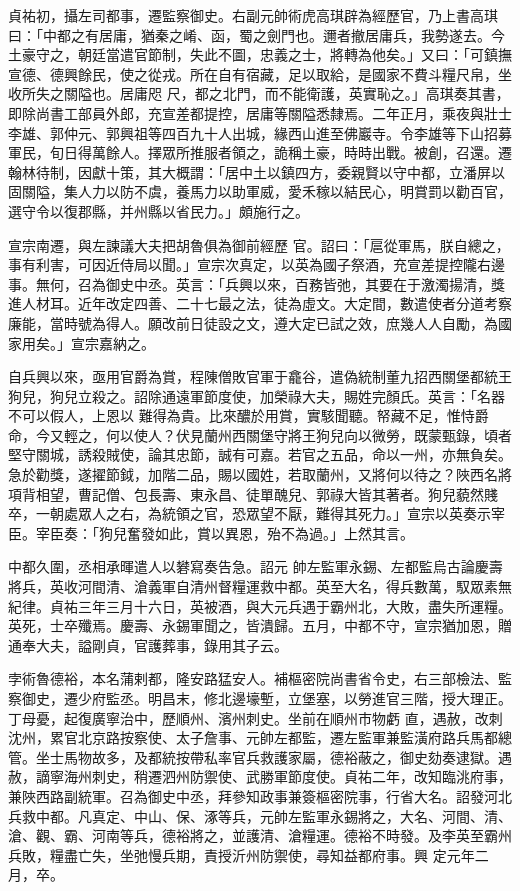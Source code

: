 \begin{pinyinscope}
 貞祐初，攝左司都事，遷監察御史。右副元帥術虎高琪辟為經歷官，乃上書高琪曰：「中都之有居庸，猶秦之崤、函，蜀之劍門也。邇者撤居庸兵，我勢遂去。今土豪守之，朝廷當遣官節制，失此不圖，忠義之士，將轉為他矣。」又曰：「可鎮撫宣德、德興餘民，使之從戎。所在自有宿藏，足以取給，是國家不費斗糧尺帛，坐收所失之關隘也。居庸咫
 尺，都之北門，而不能衛護，英實恥之。」高琪奏其書，即除尚書工部員外郎，充宣差都提控，居庸等關隘悉隸焉。二年正月，乘夜與壯士李雄、郭仲元、郭興祖等四百九十人出城，緣西山進至佛巖寺。令李雄等下山招募軍民，旬日得萬餘人。擇眾所推服者領之，詭稱土豪，時時出戰。被創，召還。遷翰林待制，因獻十策，其大概謂：「居中土以鎮四方，委親賢以守中都，立潘屏以固關隘，集人力以防不虞，養馬力以助軍威，愛禾稼以結民心，明賞罰以勸百官，選守令以復郡縣，并州縣以省民力。」頗施行之。



 宣宗南遷，與左諫議大夫把胡魯俱為御前經歷
 官。詔曰：「扈從軍馬，朕自總之，事有利害，可因近侍局以聞。」宣宗次真定，以英為國子祭酒，充宣差提控隴右邊事。無何，召為御史中丞。英言：「兵興以來，百務皆弛，其要在于激濁揚清，獎進人材耳。近年改定四善、二十七最之法，徒為虛文。大定間，數遣使者分道考察廉能，當時號為得人。願改前日徒設之文，遵大定已試之效，庶幾人人自勵，為國家用矣。」宣宗嘉納之。



 自兵興以來，亟用官爵為賞，程陳僧敗官軍于龕谷，遣偽統制董九招西關堡都統王狗兒，狗兒立殺之。詔除通遠軍節度使，加榮祿大夫，賜姓完顏氏。英言：「名器不可以假人，上恩以
 難得為貴。比來醲於用賞，實駭聞聽。帑藏不足，惟恃爵命，今又輕之，何以使人？伏見蘭州西關堡守將王狗兒向以微勞，既蒙甄錄，頃者堅守關城，誘殺賊使，論其忠節，誠有可嘉。若官之五品，命以一州，亦無負矣。急於勸獎，遂擢節鉞，加階二品，賜以國姓，若取蘭州，又將何以待之？陜西名將項背相望，曹記僧、包長壽、東永昌、徒單醜兒、郭祿大皆其著者。狗兒藐然賤卒，一朝處眾人之右，為統領之官，恐眾望不厭，難得其死力。」宣宗以英奏示宰臣。宰臣奏：「狗兒奮發如此，賞以異恩，殆不為過。」上然其言。



 中都久圍，丞相承暉遣人以礬寫奏告急。詔元
 帥左監軍永錫、左都監烏古論慶壽將兵，英收河間清、滄義軍自清州督糧運救中都。英至大名，得兵數萬，馭眾素無紀律。貞祐三年三月十六日，英被酒，與大元兵遇于霸州北，大敗，盡失所運糧。英死，士卒殲焉。慶壽、永錫軍聞之，皆潰歸。五月，中都不守，宣宗猶加恩，贈通奉大夫，謚剛貞，官護葬事，錄用其子云。



 孛術魯德裕，本名蒲剌都，隆安路猛安人。補樞密院尚書省令史，右三部檢法、監察御史，遷少府監丞。明昌末，修北邊壕塹，立堡塞，以勞進官三階，授大理正。丁母憂，起復廣寧治中，歷順州、濱州刺史。坐前在順州市物虧
 直，遇赦，改刺沈州，累官北京路按察使、太子詹事、元帥左都監，遷左監軍兼監潢府路兵馬都總管。坐士馬物故多，及都統按帶私率官兵救護家屬，德裕蔽之，御史劾奏逮獄。遇赦，謫寧海州刺史，稍遷泗州防禦使、武勝軍節度使。貞祐二年，改知臨洮府事，兼陜西路副統軍。召為御史中丞，拜參知政事兼簽樞密院事，行省大名。詔發河北兵救中都。凡真定、中山、保、涿等兵，元帥左監軍永錫將之，大名、河間、清、滄、觀、霸、河南等兵，德裕將之，並護清、滄糧運。德裕不時發。及李英至霸州兵敗，糧盡亡失，坐弛慢兵期，責授沂州防禦使，尋知益都府事。興
 定元年二月，卒。




\end{pinyinscope}

